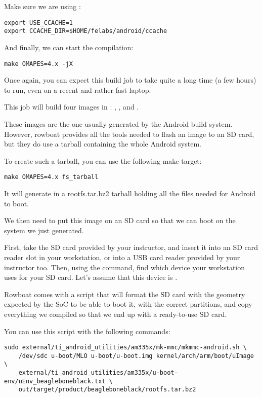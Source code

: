 Make sure we are using :

\begin{verbatim}
export USE_CCACHE=1
export CCACHE_DIR=$HOME/felabs/android/ccache
\end{verbatim}

And finally, we can start the compilation:

\begin{verbatim}
make OMAPES=4.x -jX
\end{verbatim}

Once again, you can expect this build job to take quite a long time (a
few hours) to run, even on a recent and rather fast laptop.

This job will build four images in
: ,
,  and .

These images are the one usually generated by the Android build
system. However, rowboat provides all the tools needed to flash an
image to an SD card, but they do use a tarball containing the whole
Android system.

To create such a tarball, you can use the following make target:

\begin{verbatim}
make OMAPES=4.x fs_tarball
\end{verbatim}

It will generate in  a
rootfs.tar.bz2 tarball holding all the files needed for Android to
boot.

We then need to put this image on an SD card so that we can boot on
the system we just generated.

First, take the SD card provided by your instructor, and insert it
into an SD card reader slot in your workstation, or into a USB card
reader provided by your instructor too. Then, using the 
command, find which device your workstation uses for your SD card.
Let's assume that this device is .

Rowboat comes with a script that will format the SD card with the
geometry expected by the SoC to be able to boot it, with the correct
partitions, and copy everything we compiled so that we end up with a
ready-to-use SD card.

You can use this script with the following commands:

\begin{verbatim}
sudo external/ti_android_utilities/am335x/mk-mmc/mkmmc-android.sh \
    /dev/sdc u-boot/MLO u-boot/u-boot.img kernel/arch/arm/boot/uImage \
    external/ti_android_utilities/am335x/u-boot-env/uEnv_beagleboneblack.txt \
    out/target/product/beagleboneblack/rootfs.tar.bz2
\end{verbatim}

